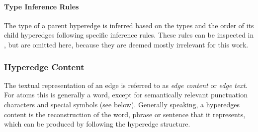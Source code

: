 \documentclass[11pt, numbers=noenddot]{scrreprt}
\let\citef\cite  %
\let\cite\parencite  %
\begin{document}

\paragraph{Type Inference Rules}
The type of a parent hyperedge is inferred based on the types and the order of its child hyperedges following specific inference rules. These rules can be inspected in \citef[p. 8]{menezesSemanticHypergraphs2021}, but are omitted here, because they are deemed mostly irrelevant for this work.


\subsubsection{Hyperedge Content}
The textual representation of an edge is referred to as \textit{edge content} or \textit{edge text}. For atoms this is generally a word, except for semantically relevant punctuation characters and special symbols (see below). Generally speaking, a hyperedges content is the reconstruction of the word, phrase or sentence that it represents, which can be produced by following the hyperedge structure.
\end{document}
